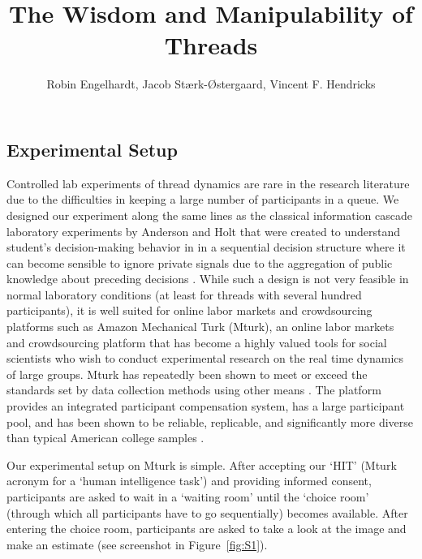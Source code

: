 \documentclass[9pt,twoside,lineno]{pnas-new}
\title{The Wisdom and Manipulability of Threads}
\author{Robin Engelhardt, Jacob Stærk-Østergaard, Vincent F. Hendricks}
\begin{document}

\maketitle

\SItext

\subsection*{Experimental Setup}
Controlled lab experiments of thread dynamics are rare in the research literature due to the difficulties in keeping a large number of participants in a queue. We designed our experiment along the same lines as the classical information cascade laboratory experiments by Anderson and Holt  that were created to understand student's decision-making behavior in in a sequential decision structure where it can become sensible to ignore private signals due to the aggregation of public knowledge about preceding decisions \cite{anderson1997information}. While such a design is not very feasible in normal laboratory conditions (at least for threads with several hundred participants), it is well suited for online labor markets and crowdsourcing platforms such as Amazon Mechanical Turk (Mturk), an online labor markets and crowdsourcing platform that has become a highly valued tools for social scientists who wish to conduct experimental research on the real time dynamics of large groups. Mturk has repeatedly been shown to meet or exceed the standards set by data collection methods using other means \cite{berinsky2012evaluating, buhrmester2018evaluation}. The platform provides an integrated participant compensation system, has a large participant pool, and has been shown to be reliable, replicable, and significantly more diverse than typical American college samples \cite{mason2009financial, buhrmester2011amazon, crump2013evaluating, rand2012promise, horton2011online}.

Our experimental setup on Mturk is simple. After accepting our ‘HIT’ (Mturk acronym for a ‘human intelligence task’) and providing informed consent, participants are asked to wait in a ‘waiting room’ until the ‘choice room’ (through which all participants have to go sequentially) becomes available. After entering the choice room, participants are asked to take a look at the image and make an estimate (see screenshot in Figure~\ref{fig:S1}).
\end{document}

